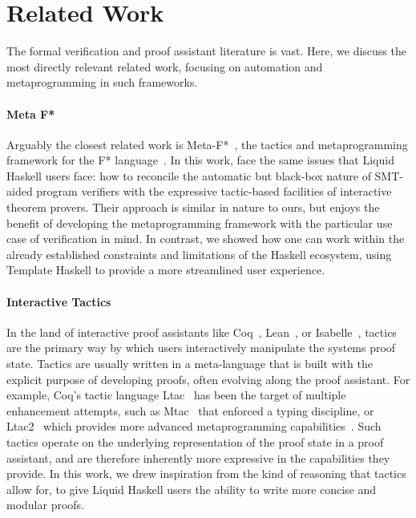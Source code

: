 \section{Related Work}
\label{sec:related}

The formal verification and proof assistant literature is vast. Here, we discuss
the most directly relevant related work, focusing on automation and metaprogramming
in such frameworks.

\paragraph{Meta F*}
Arguably the closest related work is Meta-F*~\cite{MetaF}, the tactics
and metaprogramming framework for the F* language~\cite{fstar}. In
this work, \citeauthor{MetaF} face the same issues that Liquid Haskell
users face: how to reconcile the automatic but black-box nature of
SMT-aided program verifiers with the expressive tactic-based facilities of
interactive theorem provers. Their approach is similar in nature to ours,
but enjoys the benefit of developing the metaprogramming framework with
the particular use case of verification in mind. In contrast, we showed
how one can work within the already established constraints and limitations
of the Haskell ecosystem, using Template Haskell to provide a more
streamlined user experience.

\paragraph{Interactive Tactics}
In the land of interactive proof assistants like Coq~\cite{Coq},
Lean~\cite{Lean4}, or Isabelle~\cite{Isabelle}, tactics are the
primary way by which users interactively manipulate the systems proof
state. Tactics are usually written in a meta-language that is built
with the explicit purpose of developing proofs, often evolving along
the proof assistant. For example, Coq's tactic language
Ltac~\cite{Ltac} has been the target of multiple enhancement attempts,
such as Mtac~\cite{Mtac} that enforced a typing discipline, or
Ltac2~\cite{ltac2} which provides more advanced metaprogramming
capabilities~\cite{ComputingCorrectly}. Such tactics operate on the
underlying representation of the proof state in a proof assistant, and
are therefore inherently more expressive in the capabilities they
provide. In this work, we drew inspiration from the kind of reasoning
that tactics allow for, to give Liquid Haskell users the ability to
write more concise and modular proofs.


